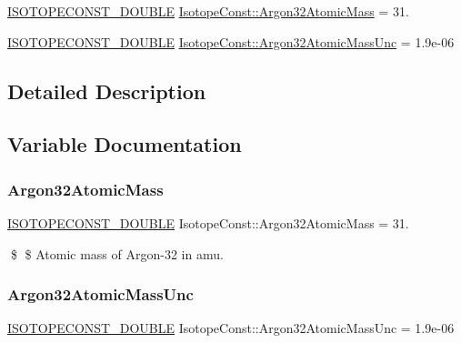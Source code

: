 \begin{DoxyCompactItemize}
\item 
\mbox{\hyperlink{group___isotope_const-_macros_ga8f45a7272ce02c0b4c65c44636ed719a}{I\+S\+O\+T\+O\+P\+E\+C\+O\+N\+S\+T\+\_\+\+D\+O\+U\+B\+LE}} \mbox{\hyperlink{group___isotope_const-_argon-_ar32_ga8d82e8426f0949ad502e8501d85999ef}{Isotope\+Const\+::\+Argon32\+Atomic\+Mass}} = 31.
\item 
\mbox{\hyperlink{group___isotope_const-_macros_ga8f45a7272ce02c0b4c65c44636ed719a}{I\+S\+O\+T\+O\+P\+E\+C\+O\+N\+S\+T\+\_\+\+D\+O\+U\+B\+LE}} \mbox{\hyperlink{group___isotope_const-_argon-_ar32_gaa956364213cdae4a46866474509cf0d9}{Isotope\+Const\+::\+Argon32\+Atomic\+Mass\+Unc}} = 1.\+9e-\/06
\end{DoxyCompactItemize}


\subsection{Detailed Description}


\subsection{Variable Documentation}
\mbox{\label{group___isotope_const-_argon-_ar32_ga8d82e8426f0949ad502e8501d85999ef}} 
\subsubsection{\texorpdfstring{Argon32\+Atomic\+Mass}{Argon32AtomicMass}}
{\footnotesize\ttfamily \mbox{\hyperlink{group___isotope_const-_macros_ga8f45a7272ce02c0b4c65c44636ed719a}{I\+S\+O\+T\+O\+P\+E\+C\+O\+N\+S\+T\+\_\+\+D\+O\+U\+B\+LE}} Isotope\+Const\+::\+Argon32\+Atomic\+Mass = 31.}

\$ \$ Atomic mass of Argon-\/32 in amu. \mbox{\label{group___isotope_const-_argon-_ar32_gaa956364213cdae4a46866474509cf0d9}} 
\subsubsection{\texorpdfstring{Argon32\+Atomic\+Mass\+Unc}{Argon32AtomicMassUnc}}
{\footnotesize\ttfamily \mbox{\hyperlink{group___isotope_const-_macros_ga8f45a7272ce02c0b4c65c44636ed719a}{I\+S\+O\+T\+O\+P\+E\+C\+O\+N\+S\+T\+\_\+\+D\+O\+U\+B\+LE}} Isotope\+Const\+::\+Argon32\+Atomic\+Mass\+Unc = 1.\+9e-\/06}

